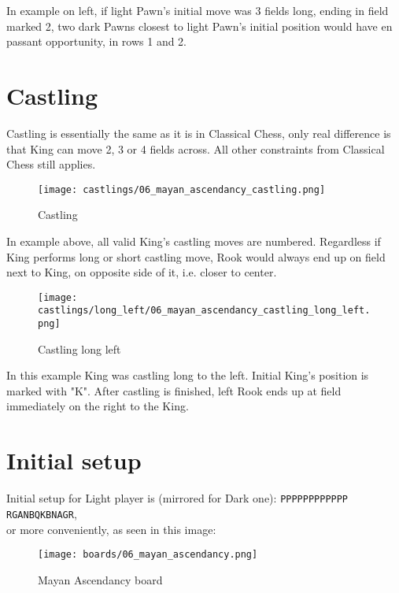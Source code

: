 In example on left, if light Pawn's initial move was 3 fields long, ending in field marked
2, two dark Pawns closest to light Pawn's initial position would have en passant opportunity,
in rows 1 and 2.

\clearpage

\section*{Castling}

Castling is essentially the same as it is in Classical Chess, only real difference is that
King can move 2, 3 or 4 fields across. All other constraints from Classical Chess still
applies.

\noindent
\begin{figure}[!h]
\texttt{[image: castlings/06\_mayan\_ascendancy\_castling.png]}
\caption{Castling}
\label{fig:ma_castling}
\end{figure}

In example above, all valid King's castling moves are numbered. Regardless if King performs
long or short castling move, Rook would always end up on field next to King, on opposite side
of it, i.e. closer to center.

\noindent
\begin{figure}[!h]
\texttt{[image: castlings/long\_left/06\_mayan\_ascendancy\_castling\_long\_left.png]}
\caption{Castling long left}
\label{fig:ma_castling_long_left}
\end{figure}

In this example King was castling long to the left. Initial King's position is marked with "K".
After castling is finished, left Rook ends up at field immediately on the right to the King.

\clearpage

\section*{Initial setup}

Initial setup for Light player is (mirrored for Dark one):
\texttt{PPPPPPPPPPPP \\
        RGANBQKBNAGR}, \\
or more conveniently, as seen in this image:

\noindent
\begin{figure}[h]
\texttt{[image: boards/06\_mayan\_ascendancy.png]}
\caption{Mayan Ascendancy board}
\label{fig:mayan_ascendancy}
\end{figure}

\clearpage
